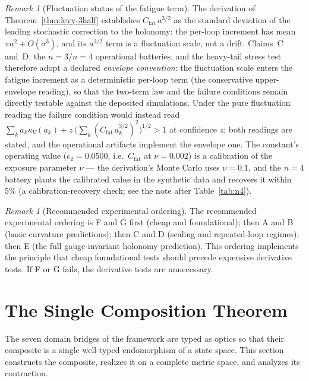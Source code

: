 \documentclass[11pt,a4paper]{article}
\theoremstyle{plain}
\theoremstyle{definition}
\theoremstyle{remark}
\newtheorem{remark}[theorem]{Remark}
\newcommand{\kk}{\kappa_{\!V}}
\begin{document}
\begin{remark}[Fluctuation status of the fatigue term]
\label{rem:fatigue-convention}
The derivation of Theorem~\ref{thm:levy-3half} establishes
$C_{\mathrm{fat}}\,a^{3/2}$ as the standard deviation of the leading
stochastic correction to the holonomy: the per-loop increment has
mean $\pi a^{2}+O(\sigma^{3})$, and its $a^{3/2}$ term is a
fluctuation scale, not a drift. Claims~C and~D, the $n=3$/$n=4$
operational batteries, and the heavy-tail stress test therefore
adopt a declared \emph{envelope convention}: the fluctuation scale
enters the fatigue increment as a deterministic per-loop term (the
conservative upper-envelope reading), so that the two-term law and
the failure conditions remain directly testable against the
deposited simulations. Under the pure fluctuation reading the
failure condition would instead read
$\sum_k a_k\kk(a_k) + z\,\bigl(\sum_k
(C_{\mathrm{fat}}\,a_k^{3/2})^{2}\bigr)^{1/2} > 1$ at confidence
$z$; both readings are stated, and the operational artifacts
implement the envelope one. The constant's operating value
($c_2=0.0500$, i.e.\ $C_{\mathrm{fat}}$ at $\nu=0.002$) is a
calibration of the exposure parameter $\nu$ --- the derivation's
Monte Carlo uses $\nu=0.1$, and the $n=4$ battery plants the
calibrated value in the synthetic data and recovers it within
$5\%$ (a calibration-recovery check; see the note after
Table~\ref{tab:n4}).
\end{remark}

\begin{remark}[Recommended experimental ordering]
\label{rem:ordering}
The recommended experimental ordering is F and G first (cheap and
foundational); then A and B (basic curvature predictions); then C and
D (scaling and repeated-loop regimes); then E (the full gauge-invariant
holonomy prediction). This ordering implements the principle that cheap
foundational tests should precede expensive derivative tests. If F or G
fails, the derivative tests are unnecessary.
\end{remark}


\section{The Single Composition Theorem}\label{sec:composition}

The seven domain bridges of the framework are typed as optics so
that their composite is a single well-typed endomorphism of a state
space. This section constructs the composite, realizes it on a
complete metric space, and analyzes its contraction.
\end{document}
